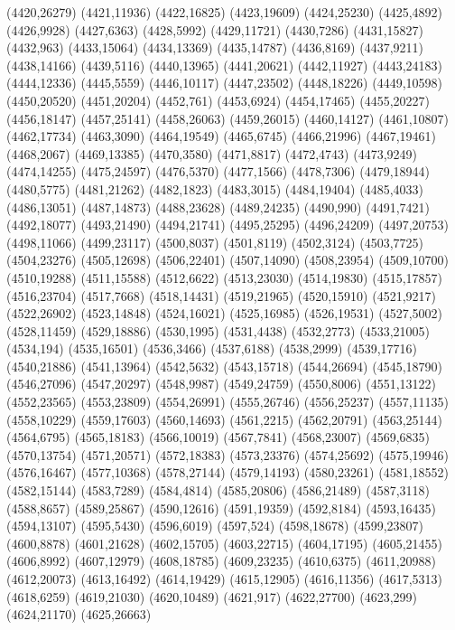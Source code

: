 (4420,26279)
(4421,11936)
(4422,16825)
(4423,19609)
(4424,25230)
(4425,4892)
(4426,9928)
(4427,6363)
(4428,5992)
(4429,11721)
(4430,7286)
(4431,15827)
(4432,963)
(4433,15064)
(4434,13369)
(4435,14787)
(4436,8169)
(4437,9211)
(4438,14166)
(4439,5116)
(4440,13965)
(4441,20621)
(4442,11927)
(4443,24183)
(4444,12336)
(4445,5559)
(4446,10117)
(4447,23502)
(4448,18226)
(4449,10598)
(4450,20520)
(4451,20204)
(4452,761)
(4453,6924)
(4454,17465)
(4455,20227)
(4456,18147)
(4457,25141)
(4458,26063)
(4459,26015)
(4460,14127)
(4461,10807)
(4462,17734)
(4463,3090)
(4464,19549)
(4465,6745)
(4466,21996)
(4467,19461)
(4468,2067)
(4469,13385)
(4470,3580)
(4471,8817)
(4472,4743)
(4473,9249)
(4474,14255)
(4475,24597)
(4476,5370)
(4477,1566)
(4478,7306)
(4479,18944)
(4480,5775)
(4481,21262)
(4482,1823)
(4483,3015)
(4484,19404)
(4485,4033)
(4486,13051)
(4487,14873)
(4488,23628)
(4489,24235)
(4490,990)
(4491,7421)
(4492,18077)
(4493,21490)
(4494,21741)
(4495,25295)
(4496,24209)
(4497,20753)
(4498,11066)
(4499,23117)
(4500,8037)
(4501,8119)
(4502,3124)
(4503,7725)
(4504,23276)
(4505,12698)
(4506,22401)
(4507,14090)
(4508,23954)
(4509,10700)
(4510,19288)
(4511,15588)
(4512,6622)
(4513,23030)
(4514,19830)
(4515,17857)
(4516,23704)
(4517,7668)
(4518,14431)
(4519,21965)
(4520,15910)
(4521,9217)
(4522,26902)
(4523,14848)
(4524,16021)
(4525,16985)
(4526,19531)
(4527,5002)
(4528,11459)
(4529,18886)
(4530,1995)
(4531,4438)
(4532,2773)
(4533,21005)
(4534,194)
(4535,16501)
(4536,3466)
(4537,6188)
(4538,2999)
(4539,17716)
(4540,21886)
(4541,13964)
(4542,5632)
(4543,15718)
(4544,26694)
(4545,18790)
(4546,27096)
(4547,20297)
(4548,9987)
(4549,24759)
(4550,8006)
(4551,13122)
(4552,23565)
(4553,23809)
(4554,26991)
(4555,26746)
(4556,25237)
(4557,11135)
(4558,10229)
(4559,17603)
(4560,14693)
(4561,2215)
(4562,20791)
(4563,25144)
(4564,6795)
(4565,18183)
(4566,10019)
(4567,7841)
(4568,23007)
(4569,6835)
(4570,13754)
(4571,20571)
(4572,18383)
(4573,23376)
(4574,25692)
(4575,19946)
(4576,16467)
(4577,10368)
(4578,27144)
(4579,14193)
(4580,23261)
(4581,18552)
(4582,15144)
(4583,7289)
(4584,4814)
(4585,20806)
(4586,21489)
(4587,3118)
(4588,8657)
(4589,25867)
(4590,12616)
(4591,19359)
(4592,8184)
(4593,16435)
(4594,13107)
(4595,5430)
(4596,6019)
(4597,524)
(4598,18678)
(4599,23807)
(4600,8878)
(4601,21628)
(4602,15705)
(4603,22715)
(4604,17195)
(4605,21455)
(4606,8992)
(4607,12979)
(4608,18785)
(4609,23235)
(4610,6375)
(4611,20988)
(4612,20073)
(4613,16492)
(4614,19429)
(4615,12905)
(4616,11356)
(4617,5313)
(4618,6259)
(4619,21030)
(4620,10489)
(4621,917)
(4622,27700)
(4623,299)
(4624,21170)
(4625,26663)
